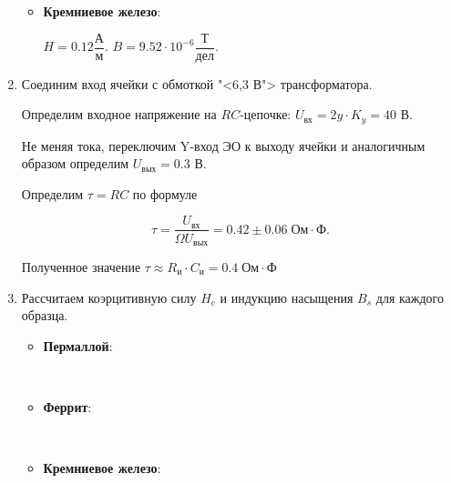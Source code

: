 \documentclass[a4paper]{article}
\begin{document}
\begin{enumerate}
\begin{itemize}
			\item \textbf{Кремниевое железо}:

			$H=0.12 \dfrac{\text{А}}{\text{м}}.$
			$B=9.52 \cdot 10^{-6}\dfrac{\text{Т}}{\text{дел}}.$

	      \end{itemize}


	\item Соединим вход ячейки с обмоткой "<6,3 В"> трансформатора.

	      Определим входное напряжение на $ RC $-цепочке: $U_\text{вх}=2y\cdot K_{y} = 40$ В.

	      Не меняя тока, переключим Y-вход ЭО к выходу ячейки и аналогичным образом определим $U_\text{вых} = 0.3$ В.

	      Определим $\tau = RC $ по формуле

	      $$\tau = \dfrac{U_\text{вх}}{\Omega U_\text{вых}}=0.42 \pm 0.06 \; \text{Ом}\cdot \text{Ф}.$$

	      Полученное значение $\tau \approx R_\text{и} \cdot C_\text{и} = 0.4 \; \text{Ом}\cdot \text{Ф}$

	\item Рассчитаем коэрцитивную силу $H_{c}$ и индукцию насыщения $B_{s}$ для каждого образца.

	      \begin{itemize}

			\item	\textbf{Пермаллой}:

			\\

			\item	\textbf{Феррит}:

			\\

			\item 	\textbf{Кремниевое железо}:

				  \\
		  \end{itemize}



\end{enumerate}
\end{document}
